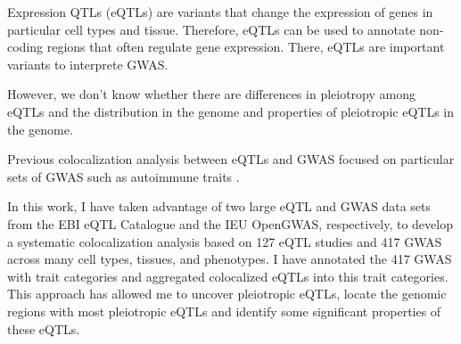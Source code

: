 Expression QTLs (eQTLs) are variants that change the expression of genes in particular cell types and tissue.
%
Therefore, eQTLs can be used to annotate non-coding regions that often regulate gene expression.
%
%
There, eQTLs are important variants to interprete GWAS.


However, we don't know whether there are differences in pleiotropy among eQTLs and the distribution in the genome and properties of  pleiotropic eQTLs in the genome.


Previous colocalization analysis between eQTLs and GWAS focused on particular sets of GWAS such as autoimmune traits \cite{2021.Li.Mu}.


In this work, I have taken advantage of two large eQTL and GWAS data sets from the EBI eQTL Catalogue and the IEU OpenGWAS, respectively,
to develop a systematic colocalization analysis based on 127 eQTL studies and 417 GWAS across many cell types, tissues, and phenotypes.
%
I have annotated the 417 GWAS with trait categories and aggregated colocalized eQTLs into this trait categories.
%
This approach has allowed me to uncover pleiotropic eQTLs, locate the genomic regions with most pleiotropic eQTLs
and identify some significant properties of these eQTLs.
%

%
%
